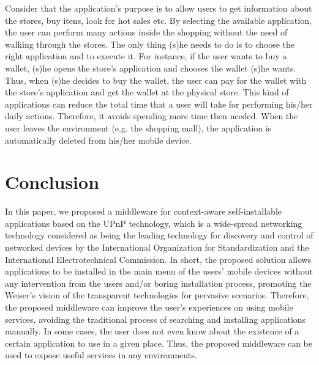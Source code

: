 \documentclass[journal]{IEEEtran}
\begin{document}
Consider that the application's purpose is to allow users to get information about the stores, buy itens, look for hot sales etc. By selecting the available application, the user can perform many actions inside the shopping without the need of walking through the stores. The only thing (s)he needs to do is to choose the right application and to execute it. For instance, if the user wants to buy a wallet, (s)he opens the store's  application and chooses the wallet (s)he wants. Thus, when (s)he decides to buy the wallet, the user can pay for the wallet with the store's application and get the wallet at the physical store. This kind of applications can reduce the total time that a user will take for performing his/her daily actions. Therefore, it avoids spending more time then needed. When the user leaves the environment (e.g. the shopping mall), the application is automatically deleted from his/her mobile device.

\section{Conclusion}
In this paper, we proposed a middleware for context-aware self-installable applications based on the UPnP technology, which is a wide-spread networking technology considered as being the leading technology for discovery and control of networked devices \cite{sherwin2009upnp} by the International Organization for Standardization and the International Electrotechnical Commission. In short, the proposed solution allows applications to be  installed in the main menu of the users' mobile devices without any intervention from the users and/or boring installation process, promoting the Weiser's vision of the transparent technologies for pervasive scenarios. Therefore, the proposed middleware can improve the user's experiences on using mobile services, avoiding the traditional process of searching and installing applications manually. In some cases, the user does not even know about the existence of a certain application to use in a given place. Thus, the proposed middleware can be used to expose useful services in any environments.

\ifCLASSOPTIONcaptionsoff
  \newpage
\fi 

{}

\end{document}
